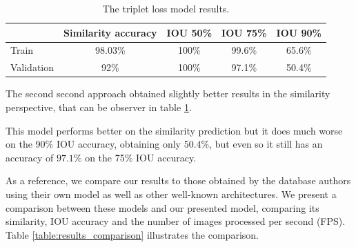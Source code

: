\documentclass{report}[12pt, a4paper]
\begin{document}

\begin{table}[ht]
    \begin{tabular}{lcccc}
    \hline
                & Similarity accuracy   & IOU 50\%  & IOU 75\%  & IOU 90\%  \\ \hline
    Train       & 98.03\%               & 100\%     & 99.6\%    & 65.6\%    \\ \hline
    Validation  & 92\%                  & 100\%     & 97.1\%    & 50.4\%    \\ \hline
    \end{tabular}
    \centering
    \caption{The triplet loss model results.}
    \label{table:second_model_accuracies}
\end{table}

The second second approach obtained slightly better results in the similarity perspective, that can be observer in table \ref{table:second_model_accuracies}.

This model performs better on the similarity prediction but it does much worse on the 90\% IOU accuracy, obtaining only $50.4\%$, but even so it still has an accuracy of $97.1\%$ on the 75\% IOU accuracy.

As a reference, we compare our results to those obtained by the database authors using their own model as well as other well-known architectures. We present a comparison between these models and our presented model, comparing its similarity, IOU accuracy and the number of images processed per second (FPS). Table \ref{table:results_comparison} illustrates the comparison.
\end{document}
